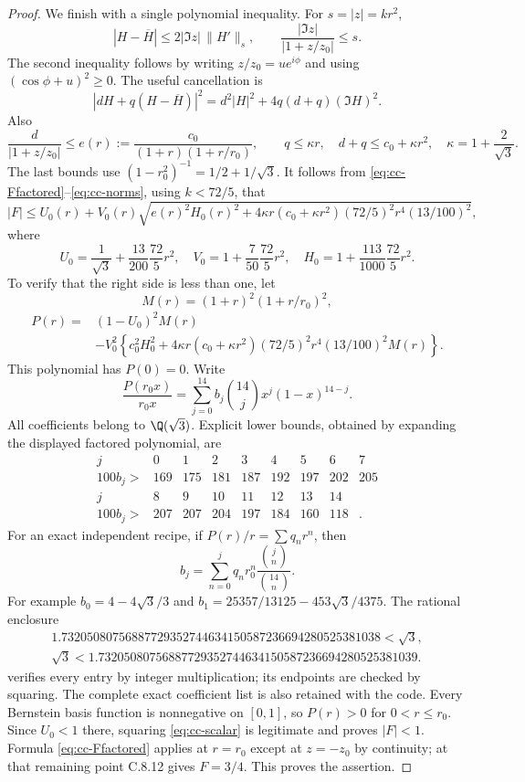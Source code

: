 \begin{proof}
We finish with a single polynomial inequality. For $s=|z|=kr^2$,
\[
 |H-\overline H|\le2|\Im z|\,\|H'\|_s,\qquad
 \frac{|\Im z|}{|1+z/z_0|}\le s.
\]
The second inequality follows by writing $z/z_0=ue^{i\phi}$
and using $(\cos\phi+u)^2\ge0$. The useful cancellation is
\[
 |dH+q(H-\overline H)|^2
      =d^2|H|^2+4q(d+q)(\Im H)^2.
\]
Also
\[
 \frac d{|1+z/z_0|}\le
 e(r):=\frac{c_0}{(1+r)(1+r/r_0)},\qquad
 q\le\kappa r,\quad d+q\le c_0+\kappa r^2,
 \quad\kappa=1+\frac2{\sqrt3}.
\]
The last bounds use $(1-r_0^2)^{-1}=1/2+1/\sqrt3$.
It follows from \eqref{eq:cc-Ffactored}--\eqref{eq:cc-norms},
using $k<72/5$, that
\begin{equation}\label{eq:cc-scalar}
 |F|\le U_0(r)+V_0(r)
 \sqrt{e(r)^2H_0(r)^2+
       4\kappa r(c_0+\kappa r^2)(72/5)^2r^4(13/100)^2},
\end{equation}
where
\[
 U_0=\frac1{\sqrt3}+\frac{13}{200}\frac{72}{5}r^2,
 \quad V_0=1+\frac7{50}\frac{72}{5}r^2,
 \quad H_0=1+\frac{113}{1000}\frac{72}{5}r^2.
\]
To verify that the right side is less than one, let
\[
 M(r)=(1+r)^2(1+r/r_0)^2,
\]
\begin{equation}\label{eq:cc-P}
 \begin{aligned}
 P(r)={}&(1-U_0)^2M(r)\\
 &-V_0^2\left\{c_0^2H_0^2+
 4\kappa r(c_0+\kappa r^2)(72/5)^2r^4(13/100)^2M(r)\right\}.
 \end{aligned}
\end{equation}
This polynomial has $P(0)=0$. Write
\[
 \frac{P(r_0x)}{r_0x}
     =\sum_{j=0}^{14}b_j\binom{14}{j}x^j(1-x)^{14-j}.
\]
All coefficients belong to $\Q(\sqrt3)$. Explicit lower bounds,
obtained by expanding the displayed factored polynomial, are
\[
 \begin{array}{c|rrrrrrrr}
 j&0&1&2&3&4&5&6&7\\ \hline
 100b_j>&169&175&181&187&192&197&202&205\\[2pt]
 j&8&9&10&11&12&13&14&\\ \hline
 100b_j>&207&207&204&197&184&160&118&.
 \end{array}
\]
For an exact independent recipe, if $P(r)/r=\sum q_nr^n$,
then
\[
 b_j=\sum_{n=0}^j q_nr_0^n
                  \frac{\binom jn}{\binom{14}n}.
\]
For example $b_0=4-4\sqrt3/3$ and
$b_1=25357/13125-453\sqrt3/4375$. The rational enclosure
\[
 \begin{gathered}
 1.73205080756887729352744634150587236694280525381038<\sqrt3,\\
 \sqrt3<1.73205080756887729352744634150587236694280525381039.
 \end{gathered}
\]
verifies every entry by integer multiplication; its endpoints
are checked by squaring. The complete exact coefficient list is
also retained with the code. Every Bernstein basis function is
nonnegative on $[0,1]$, so $P(r)>0$ for $0<r\le r_0$.
Since $U_0<1$ there, squaring \eqref{eq:cc-scalar} is legitimate
and proves $|F|<1$. Formula \eqref{eq:cc-Ffactored} applies
at $r=r_0$ except at $z=-z_0$ by continuity; at that remaining
point C.8.12 gives $F=3/4$. This proves the assertion.
\end{proof}

